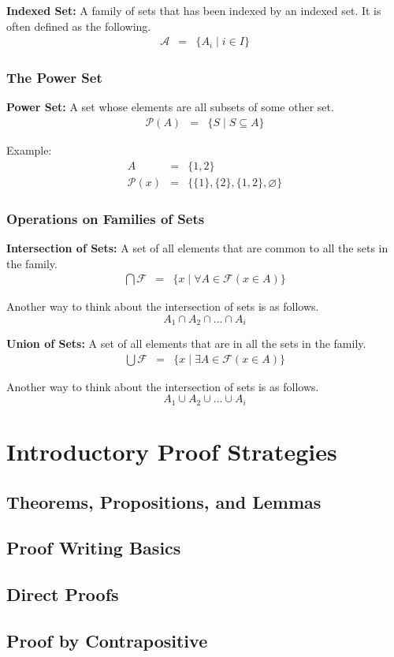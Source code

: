 \documentclass{article}
\begin{document}
\noindent \textbf{Indexed Set:} A family of sets that has been indexed by an indexed set.
It is often defined as the following.
\begin{eqnarray}
    \mathcal{A} &=& \{A_i \; | \; i \in I\}
\end{eqnarray}

\subsubsection{The Power Set}
\textbf{Power Set:} A set whose elements are all subsets of some other set.
\begin{eqnarray}
    \mathcal{P}(A) &=& \{ S \; | \; S \subseteq  A \}
\end{eqnarray}

\noindent Example:
\begin{eqnarray} \nonumber
    A &=& \{ 1, 2 \} \\ \nonumber
    \mathcal{P}(x) &=& \{ \{1\}, \{2\}, \{1, 2\}, \varnothing \}
\end{eqnarray}

\subsubsection{Operations on Families of Sets}
\textbf{Intersection of Sets:} A set of all elements that are common to all the sets
in the family.
\begin{eqnarray}
    \bigcap \mathcal{F} &=& \{ x \; | \; \forall A \in \mathcal{F}(x \in A) \}
\end{eqnarray}

\noindent Another way to think about the intersection of sets is as follows.
\[ A_1 \cap A_2 \cap ... \cap A_i \]

\noindent \textbf{Union of Sets:} A set of all elements that are in all the sets
in the family.
\begin{eqnarray}
    \bigcup \mathcal{F} &=& \{ x \; | \; \exists A \in \mathcal{F}(x \in A) \}
\end{eqnarray}

\noindent Another way to think about the intersection of sets is as follows.
\[ A_1 \cup A_2 \cup ... \cup A_i \]

\section{Introductory Proof Strategies}
\subsection{Theorems, Propositions, and Lemmas}
\subsection{Proof Writing Basics}
\subsection{Direct Proofs}
\subsection{Proof by Contrapositive}
\end{document}

